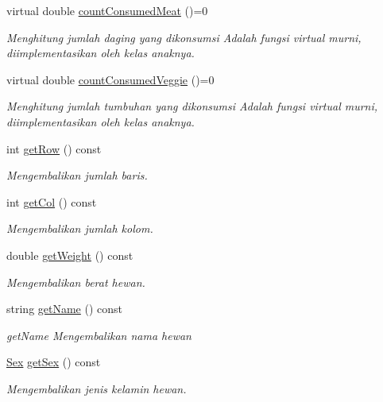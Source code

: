 \begin{DoxyCompactItemize}
virtual double \hyperlink{classAnimal_a84ccc380d237650f2bf24d792627d376}{count\+Consumed\+Meat} ()=0
\begin{DoxyCompactList}\small\item\em Menghitung jumlah daging yang dikonsumsi Adalah fungsi virtual murni, diimplementasikan oleh kelas anaknya. \end{DoxyCompactList}\item 
virtual double \hyperlink{classAnimal_aaa7e4bdb7f5a10060b6dcaf09215f822}{count\+Consumed\+Veggie} ()=0
\begin{DoxyCompactList}\small\item\em Menghitung jumlah tumbuhan yang dikonsumsi Adalah fungsi virtual murni, diimplementasikan oleh kelas anaknya. \end{DoxyCompactList}\item 
int \hyperlink{classAnimal_aa3c07c4eea7541a53c0b3b1ab60ee823}{get\+Row} () const 
\begin{DoxyCompactList}\small\item\em Mengembalikan jumlah baris. \end{DoxyCompactList}\item 
int \hyperlink{classAnimal_a8d5109b00432d23c5d92994f16f7f4d3}{get\+Col} () const 
\begin{DoxyCompactList}\small\item\em Mengembalikan jumlah kolom. \end{DoxyCompactList}\item 
double \hyperlink{classAnimal_a236f28ce33ff9d88b19289decf04e85d}{get\+Weight} () const 
\begin{DoxyCompactList}\small\item\em Mengembalikan berat hewan. \end{DoxyCompactList}\item 
string \hyperlink{classAnimal_a1b2cd74cdd5dee4f3673515bf7672a61}{get\+Name} () const 
\begin{DoxyCompactList}\small\item\em get\+Name Mengembalikan nama hewan \end{DoxyCompactList}\item 
\hyperlink{sex_8h_a2633cb393c68bb2ee8080db58fb7ba93}{Sex} \hyperlink{classAnimal_ab893137840cdbcc79bf37d1917fdb07d}{get\+Sex} () const 
\begin{DoxyCompactList}\small\item\em Mengembalikan jenis kelamin hewan. \end{DoxyCompactList}\item 

\end{DoxyCompactItemize}
